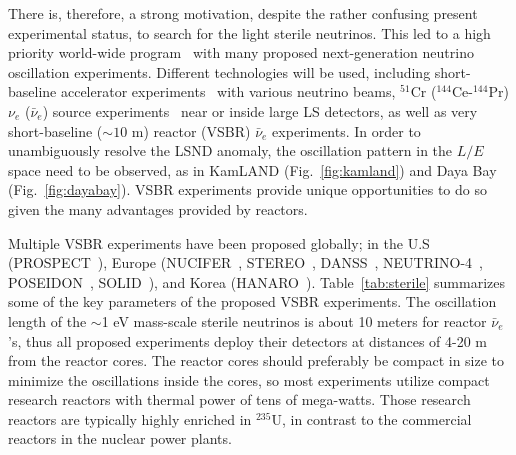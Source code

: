 \documentclass[aps,twocolumn,preprintnumbers,amsmath,superscriptaddress,amssymb,floats,nofootinbib]{revtex4-1}
\begin{document}
There is, therefore, a strong motivation, despite the rather confusing present experimental status, to search for the light sterile neutrinos.
This led to a high priority world-wide program~\cite{sterileWP} with many proposed next-generation neutrino oscillation experiments.
Different technologies will be used, including short-baseline accelerator experiments~\cite{IsoDAR,OscSNS,NESSiE,LAr1-ND,nuSTORM} with various neutrino beams, 
$^{51}$Cr ($^{144}$Ce-$^{144}$Pr) $\nu_e$ ($\bar\nu_e$) source experiments~\cite{Cribier2011,Dwyer2013,SOX,CeLAND} near or inside large LS detectors, as well as very short-baseline ($\sim10$ m) reactor (VSBR) $\bar\nu_e$ experiments. 
In order to unambiguously resolve the LSND anomaly, the oscillation pattern in the $L/E$ space need to be observed, as in KamLAND (Fig.~\ref{fig:kamland}) and Daya Bay (Fig.~\ref{fig:dayabay}). 
VSBR experiments provide unique opportunities to do so given the many advantages provided by reactors.

Multiple VSBR experiments have been proposed globally; in the U.S (PROSPECT~\cite{PROSPECT}), Europe (NUCIFER~\cite{NUCIFER-2010, NUCIFER-2014}, STEREO~\cite{sterileWP}, DANSS~\cite{DANSS}, NEUTRINO-4~\cite{NEUTRINO4-2012,NEUTRINO4-2014}, POSEIDON~\cite{POSEIDON}, SOLID~\cite{Lasserre-Neutrino14}), and Korea (HANARO~\cite{HANARO}). 
Table~\ref{tab:sterile} summarizes some of the key parameters of the proposed VSBR experiments. 
The oscillation length of the $\sim$1 eV mass-scale sterile neutrinos is about 10 meters for reactor $\bar\nu_e$'s, thus all proposed experiments deploy their detectors at distances of 4-20 m from the reactor cores. 
The reactor cores should preferably be compact in size to minimize the oscillations inside the cores, 
so most experiments utilize compact research reactors with thermal power of tens of mega-watts. Those research reactors are typically highly enriched in $^{235}$U, in contrast to the commercial reactors in the nuclear power plants. 
\end{document}

